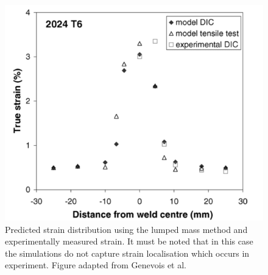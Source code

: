 \begin{figure}[h!]
	\centering
	\includegraphics[width=0.75\linewidth]{Figures/LiteratureReview/LumpedMassMatching}
	\caption[Correlation using lumped mass method]{Predicted strain distribution using the lumped mass method and experimentally measured strain. It must be noted that in this case the simulations do not capture strain localisation which occurs in experiment. Figure adapted from Genevois et al. \cite{Genevois2006}}
	\label{fig:LumpedMassMatching}
\end{figure}

